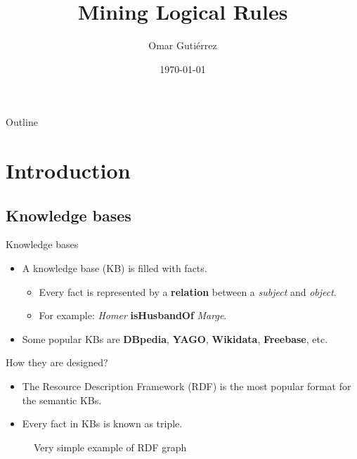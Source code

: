 \documentclass[xcolor={x11names}]{beamer}
\title[Mining Logical Rules]{Mining Logical Rules}
\author{Omar Gutiérrez}
\institute{}
\date{\today}
\begin{document}
\begin{frame}
  \titlepage
\end{frame}

\begin{frame}{Outline}
  \tableofcontents
\end{frame}

\section{Introduction}
\subsection{Knowledge bases}

\begin{frame}{Knowledge bases}
\begin{itemize}
  \item A knowledge base (KB) is filled with facts.
  		\begin{itemize}

        \item Every fact is represented by a \textbf{relation} between a
            \textit{subject} and \textit{object}.
        \item For example: \textit{Homer} \textbf{isHusbandOf} \textit{Marge}.
  		\end{itemize}
  \item Some popular KBs are \textbf{DBpedia}, \textbf{YAGO}, \textbf{Wikidata}, \textbf{Freebase}, etc.
\end{itemize}

\end{frame}

\begin{frame}{How they are designed?}
\begin{itemize}
  \item The Resource Description Framework (RDF) is the most popular format for the semantic KBs.
  \item Every fact in KBs is known as triple.
\end{itemize}

\vskip 0.2cm

\begin{figure}
\resizebox{7.555cm}{!}{%
    
}
\caption{Very simple example of RDF graph}
\label{fig:rdf}
\end{figure}

\end{frame}
\end{document}
